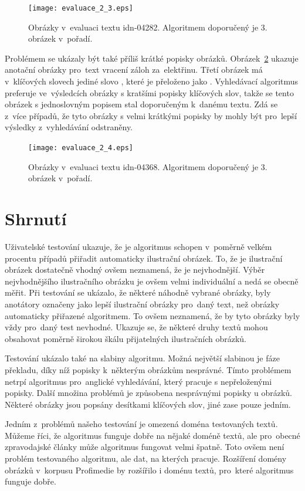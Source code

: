\begin{figure}[h]
  \centering
  \texttt{[image: evaluace\_2\_3.eps]}
  \caption{Obrázky v~evaluaci textu idn-04282. Algoritmem doporučený je 3. obrázek v~pořadí.}
  \label{fig:evaluace_2_3}
\end{figure}


Problémem se ukázaly být také příliš krátké popisky obrázků. Obrázek~\ref{fig:evaluace_2_4} ukazuje anotační obrázky pro~text vracení záloh za~elektřinu. Třetí obrázek má v~klíčových slovech jediné slovo , které je přeloženo jako . Vyhledávací algoritmus preferuje ve~výsledcích obrázky s kratšími popisky klíčových slov, takže se tento obrázek s jednoslovným popisem stal doporučeným k~danému textu. Zdá se z~více případů, že tyto obrázky s velmi krátkými popisky by mohly být pro~lepší výsledky z~vyhledávání odstraněny.

\begin{figure}[h]
  \centering
  \texttt{[image: evaluace\_2\_4.eps]}
  \caption{Obrázky v~evaluaci textu idn-04368. Algoritmem doporučený je 3. obrázek v~pořadí.}
  \label{fig:evaluace_2_4}
\end{figure}

\section{Shrnutí}

Uživatelské testování ukazuje, že je algoritmus schopen v~poměrně velkém procentu případů přiřadit automaticky  ilustrační obrázek. To, že je ilustrační obrázek dostatečně vhodný ovšem neznamená, že je nejvhodnější. Výběr nejvhodnějšího ilustračního obrázku je ovšem velmi individuální a nedá se obecně měřit. Při testování se ukázalo, že některé náhodně vybrané obrázky, byly anotátory označeny jako lepší ilustrační obrázky pro~daný text, než obrázky automaticky přiřazené algoritmem. To ovšem neznamená, že by tyto obrázky byly vždy pro~daný test nevhodné. Ukazuje se, že některé druhy textů mohou obsahovat poměrně širokou škálu přijatelných ilustračních obrázků.

Testování ukázalo také na slabiny algoritmu. Možná největší slabinou je fáze překladu, díky níž popisky k~některým obrázkům nesprávné. Tímto problémem netrpí algoritmus pro~anglické vyhledávání, který pracuje s nepřeloženými popisky. Další množina problémů je způsobena nesprávnými popisky u obrázků. Některé obrázky jsou popsány desítkami klíčových slov, jiné zase pouze jedním.

Jedním z~problémů našeho testování je omezená doména testovaných textů. Můžeme říci, že algoritmus funguje dobře na nějaké doméně textů, ale pro~obecné zpravodajské články může algoritmus fungovat velmi špatně. Toto ovšem není problém testovaného algoritmu, ale dat, na kterých pracuje. Rozšíření domény obrázků v~korpusu Profimedie by rozšířilo i doménu textů, pro~které algoritmus funguje dobře.








